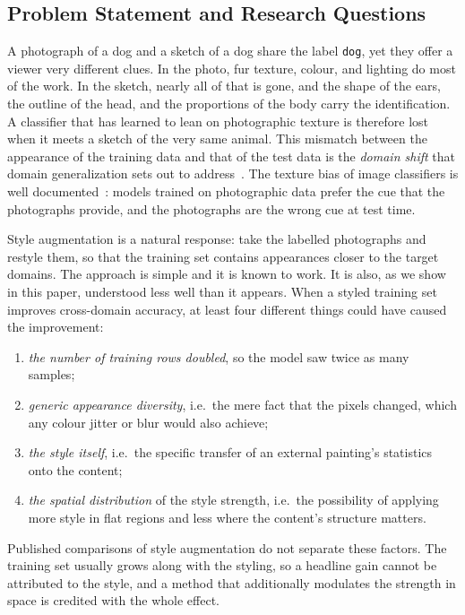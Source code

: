 \subsection{Problem Statement and Research Questions}
\label{sec:problem}

A photograph of a dog and a sketch of a dog share the label \texttt{dog}, yet they offer a viewer very different clues. In the photo, fur texture, colour, and lighting do most of the work. In the sketch, nearly all of that is gone, and the shape of the ears, the outline of the head, and the proportions of the body carry the identification. A classifier that has learned to lean on photographic texture is therefore lost when it meets a sketch of the very same animal. This mismatch between the appearance of the training data and that of the test data is the \textit{domain shift} that domain generalization sets out to address~\cite{zhou2023dgsurvey}. The texture bias of image classifiers is well documented~\cite{geirhos2019imagenet}: models trained on photographic data prefer the cue that the photographs provide, and the photographs are the wrong cue at test time.

Style augmentation is a natural response: take the labelled photographs and restyle them, so that the training set contains appearances closer to the target domains. The approach is simple and it is known to work. It is also, as we show in this paper, understood less well than it appears. When a styled training set improves cross-domain accuracy, at least four different things could have caused the improvement:

\begin{enumerate}
\item \textit{the number of training rows doubled}, so the model saw twice as many samples;
\item \textit{generic appearance diversity}, i.e.\ the mere fact that the pixels changed, which any colour jitter or blur would also achieve;
\item \textit{the style itself}, i.e.\ the specific transfer of an external painting's statistics onto the content;
\item \textit{the spatial distribution} of the style strength, i.e.\ the possibility of applying more style in flat regions and less where the content's structure matters.
\end{enumerate}

Published comparisons of style augmentation do not separate these factors. The training set usually grows along with the styling, so a headline gain cannot be attributed to the style, and a method that additionally modulates the strength in space is credited with the whole effect.

